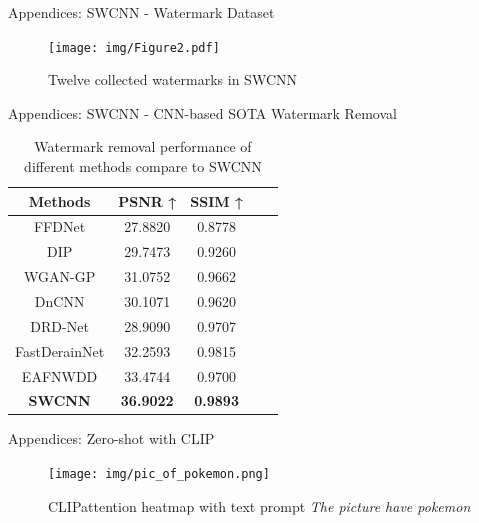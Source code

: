 \begin{frame}{Appendices: SWCNN - Watermark Dataset}
    \begin{figure}
        \centering
        \texttt{[image: img/Figure2.pdf]}
        \caption{Twelve collected watermarks in SWCNN \footnotemark}
    \end{figure}
\end{frame}

\begin{frame}{Appendices: SWCNN - CNN-based SOTA Watermark Removal}
    \begin{table}[t]
    \centering
    \begin{tabular}{cccll}
        \hline
        \textbf{Methods}                             & \textbf{PSNR ↑}  & \textbf{SSIM ↑} \\ \hline
        FFDNet               & 27.8820          & 0.8778          \\
        DIP                  & 29.7473          & 0.9260          \\
        WGAN-GP               & 31.0752          & 0.9662          \\
        DnCNN               & 30.1071          & 0.9620          \\
        {DRD-Net }                 & 28.9090          & 0.9707          \\
        {FastDerainNet } & 32.2593          & 0.9815          \\
        {EAFNWDD }            & 33.4744          & 0.9700          \\
        \textbf{SWCNN}\footnotemark             & \textbf{36.9022} & \textbf{0.9893} \\ \hline
    \end{tabular}
    \caption[Watermark removal performance of different methods]{Watermark removal performance of different methods compare to SWCNN \footnotemark}
    \label{table:swcnn}
\end{table}
\end{frame}


\begin{frame}{Appendices: Zero-shot with CLIP}
    \begin{figure}[t]
    \centering
    \texttt{[image: img/pic\_of\_pokemon.png]}
    \caption{CLIP\footnotemark attention heatmap with text prompt \textit{The picture have pokemon}}
    \label{fig:pic_of_pokemon}
\end{figure}
\end{frame}


